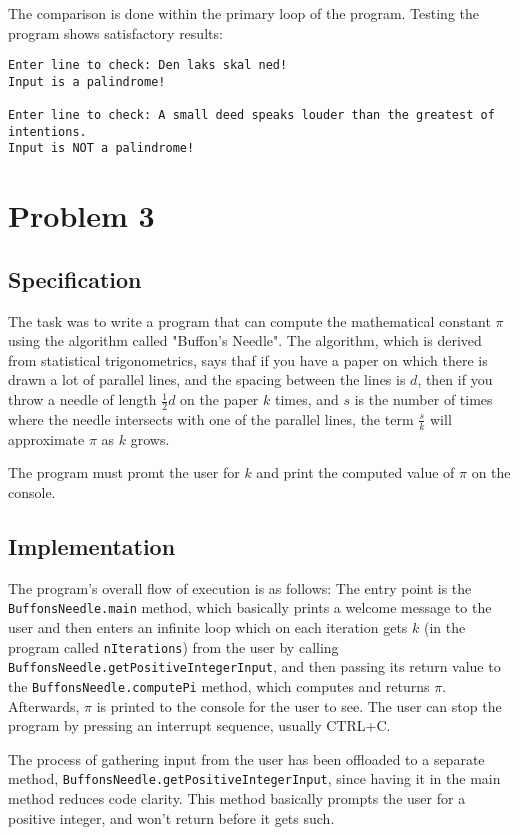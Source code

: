 \documentclass{scrartcl}
\newcommand\code[1]{\texttt{#1}}
\begin{document}
The comparison is done within the primary loop of the program.
Testing the program shows satisfactory results:
\begin{Verbatim}
Enter line to check: Den laks skal ned!
Input is a palindrome!

Enter line to check: A small deed speaks louder than the greatest of intentions.
Input is NOT a palindrome!
\end{Verbatim}









\section*{Problem 3}
\subsection*{Specification}
The task was to write a program that can compute the mathematical 
constant $\pi$ using the algorithm called "Buffon's Needle".
The algorithm, which is derived from statistical trigonometrics, says
thaf if you have a paper on which there is drawn a lot of parallel
lines, and the spacing between the lines is $d$, then if you throw
a needle of length $\frac{1}{2}d$ on the paper $k$ times, and $s$
is the number of times where the needle intersects with one
of the parallel lines, the term $\frac{s}{k}$ will approximate $\pi$  
as $k$ grows.

The program must promt the user for $k$ and print the computed
value of $\pi$  on the console.

\subsection*{Implementation}
The program's overall flow of execution is as follows:
The entry point is the \code{BuffonsNeedle.main} method, which
basically prints a welcome message to the user and then enters an
infinite loop which on each iteration gets $k$ (in the program
called \code{nIterations}) from the user by calling
\code{BuffonsNeedle.getPositiveIntegerInput}, and then passing
its return value to the \code{BuffonsNeedle.computePi} method, which
computes and returns $\pi$.  Afterwards, $\pi$  is printed to the
console for the user to see. The user can stop the program by pressing
an interrupt sequence, usually CTRL+C.

The process of gathering input from the user has been offloaded to a
separate method, \code{BuffonsNeedle.getPositiveIntegerInput}, since
having it in the main method reduces code clarity. This method
basically prompts the user for a positive integer, and won't return
before it gets such.
\end{document}
